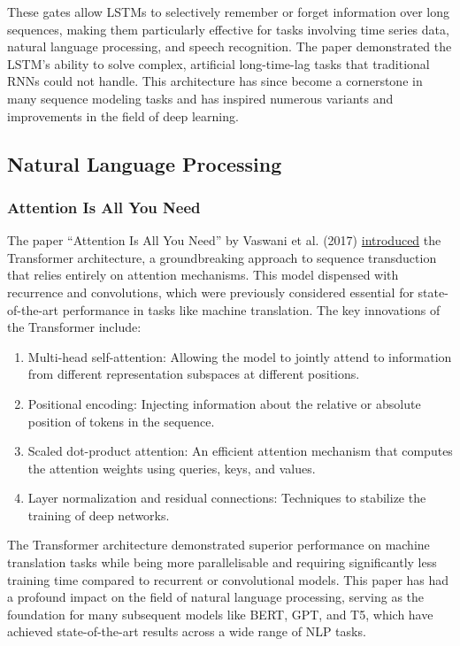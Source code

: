 \documentclass{article}
\begin{document}
These gates allow LSTMs to selectively remember or forget information over long sequences, making them particularly effective for tasks involving time series data, natural language processing, and speech recognition. The paper demonstrated the LSTM's ability to solve complex, artificial long-time-lag tasks that traditional RNNs could not handle. This architecture has since become a cornerstone in many sequence modeling tasks and has inspired numerous variants and improvements in the field of deep learning.

\subsection{Natural Language Processing}

\subsubsection*{Attention Is All You Need}

The paper ``Attention Is All You Need'' by Vaswani et al. (2017) \href{https://arxiv.org/pdf/1706.03762}{introduced} the Transformer architecture, a groundbreaking approach to sequence transduction that relies entirely on attention mechanisms.\cite{Vaswani2017} This model dispensed with recurrence and convolutions, which were previously considered essential for state-of-the-art performance in tasks like machine translation. The key innovations of the Transformer include:
\begin{enumerate}
    \item Multi-head self-attention: Allowing the model to jointly attend to information from different representation subspaces at different positions.
    \item Positional encoding: Injecting information about the relative or absolute position of tokens in the sequence.
    \item Scaled dot-product attention: An efficient attention mechanism that computes the attention weights using queries, keys, and values.
    \item Layer normalization and residual connections: Techniques to stabilize the training of deep networks.
\end{enumerate}

The Transformer architecture demonstrated superior performance on machine translation tasks while being more parallelisable and requiring significantly less training time compared to recurrent or convolutional models. This paper has had a profound impact on the field of natural language processing, serving as the foundation for many subsequent models like BERT, GPT, and T5, which have achieved state-of-the-art results across a wide range of NLP tasks.
\end{document}
